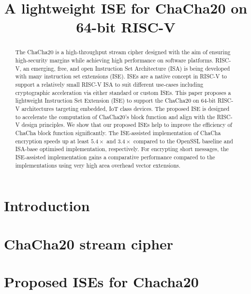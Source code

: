 \documentclass[preprint]{iacrtrans}
\title{A lightweight ISE for ChaCha20 on 64-bit RISC-V}
\author{}
\institute{}
\begin{document}

\maketitle

\begin{abstract}
The ChaCha20 is a high-throughput stream cipher designed with the aim of ensuring high-security margins while achieving high performance on software platforms. RISC-V, an emerging, free, and open Instruction Set Architecture (ISA) is being developed with many instruction set extensions (ISE). ISEs are a native concept in RISC-V to support a relatively small RISC-V ISA to suit different use-cases including cryptographic acceleration via either standard or custom ISEs. This paper proposes a lightweight Instruction Set Extension (ISE) to support the ChaCha20 on 64-bit RISC-V architectures targeting embedded, IoT class devices. The proposed ISE is designed to accelerate the computation of ChaCha20's block function and align with the  RISC-V design principles. We show that our proposed ISEs help to improve the efficiency of ChaCha block function significantly. 
The ISE-assisted implementation of ChaCha encryption speeds up at least $5.4\times$ and $3.4\times$ compared to the OpenSSL baseline and ISA-base optimised implementation, respectively. 
For encrypting short messages, the ISE-assisted implementation gains a comparative performance compared to the implementations using very high area overhead vector extensions.
\end{abstract}



\section{Introduction}
\label{sec:intro}


\section{ChaCha20 stream cipher}
\label{sec:bg}


\section{Proposed ISEs for Chacha20}
\label{sec:ise}

\end{document}
